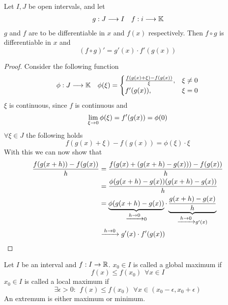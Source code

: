 \documentclass[../../script.tex]{subfiles}
\begin{document}
\begin{thm}
    Let $I, J$ be open intervals, and let 
    \begin{align*}
        g: J \longrightarrow I && f: i \longrightarrow \mathbb{K}
    \end{align*}
    $g$ and $f$ are to be differentiable in $x$ and $f(x)$ respectively. Then $f \circ g$ is differentiable in $x$ and 
    \[
        (f \circ g)' = g'(x) \cdot f'(g(x))
    \]
\end{thm}
\begin{proof}
    Consider the following function 
    \begin{align}
        \phi: J \longrightarrow \mathbb{K} && \phi(\xi) = \begin{cases}
            \frac{f(g(x) + \xi) - f(g(x))}{\xi}, & \xi \ne 0 \\
            f'(g(x)), & \xi = 0
        \end{cases}
    \end{align}
    $\xi$ is continuous, since $f$ is continuous and 
    \begin{equation}
        \lim_{\xi \rightarrow 0} \phi(\xi) = f'(g(x)) = \phi(0)
    \end{equation}
    $\forall \xi \in J$ the following holds 
    \begin{equation}
        f(g(x) + \xi) - f(g(x)) = \phi(\xi) \cdot \xi 
    \end{equation}
    With this we can now show that 
    \begin{equation}
    \begin{split}
        \frac{f(g(x+h)) - f(g(x))}{h} &= \frac{f(g(x) + (g(x + h) - g(x))) - f(g(x))}{h} \\
        &= \frac{\phi(g(x + h) - g(x))(g(x + h) - g(x))}{h} \\
        &= \underbrace{\phi(g(x + h) - g(x))}_{\conv{h \rightarrow 0}0} \cdot \underbrace{\frac{g(x + h) - g(x)}{h}}_{\conv{h \rightarrow 0}g'(x)} \\
        &\conv{h \rightarrow 0} g'(x) \cdot f'(g(x))
    \end{split}
    \end{equation}
\end{proof}

\begin{defi}
    Let $I$ be an interval and $f: I \rightarrow \mathbb{R}$. $x_0 \in I$ is called a global maximum if 
    \[
        f(x) \le f(x_0) ~~\forall x \in I
    \]
    $x_0 \in I$ is called a local maximum if 
    \[
        \exists \epsilon > 0: ~~f(x) \le f(x_0) ~~\forall x \in (x_0 - \epsilon, x_0 + \epsilon)
    \]
    An extremum is either maximum or minimum.
\end{defi}
\end{document}

